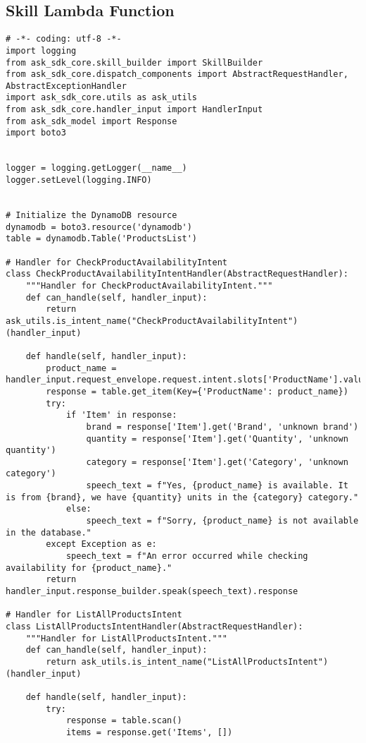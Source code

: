 \documentclass[12pt]{article}
\begin{document}
\subsection{Skill Lambda Function}\label{appendix:lambda}
\begin{lstlisting}
# -*- coding: utf-8 -*-
import logging
from ask_sdk_core.skill_builder import SkillBuilder
from ask_sdk_core.dispatch_components import AbstractRequestHandler, AbstractExceptionHandler
import ask_sdk_core.utils as ask_utils
from ask_sdk_core.handler_input import HandlerInput
from ask_sdk_model import Response
import boto3


logger = logging.getLogger(__name__)
logger.setLevel(logging.INFO)


# Initialize the DynamoDB resource
dynamodb = boto3.resource('dynamodb')
table = dynamodb.Table('ProductsList')

# Handler for CheckProductAvailabilityIntent
class CheckProductAvailabilityIntentHandler(AbstractRequestHandler):
    """Handler for CheckProductAvailabilityIntent."""
    def can_handle(self, handler_input):
        return ask_utils.is_intent_name("CheckProductAvailabilityIntent")(handler_input)

    def handle(self, handler_input):
        product_name = handler_input.request_envelope.request.intent.slots['ProductName'].value
        response = table.get_item(Key={'ProductName': product_name})
        try:
            if 'Item' in response:
                brand = response['Item'].get('Brand', 'unknown brand')
                quantity = response['Item'].get('Quantity', 'unknown quantity')
                category = response['Item'].get('Category', 'unknown category')
                speech_text = f"Yes, {product_name} is available. It is from {brand}, we have {quantity} units in the {category} category."
            else:
                speech_text = f"Sorry, {product_name} is not available in the database."
        except Exception as e:
            speech_text = f"An error occurred while checking availability for {product_name}."
        return handler_input.response_builder.speak(speech_text).response

# Handler for ListAllProductsIntent
class ListAllProductsIntentHandler(AbstractRequestHandler):
    """Handler for ListAllProductsIntent."""
    def can_handle(self, handler_input):
        return ask_utils.is_intent_name("ListAllProductsIntent")(handler_input)

    def handle(self, handler_input):
        try:
            response = table.scan()
            items = response.get('Items', [])
            

\end{lstlisting}
\end{document}
